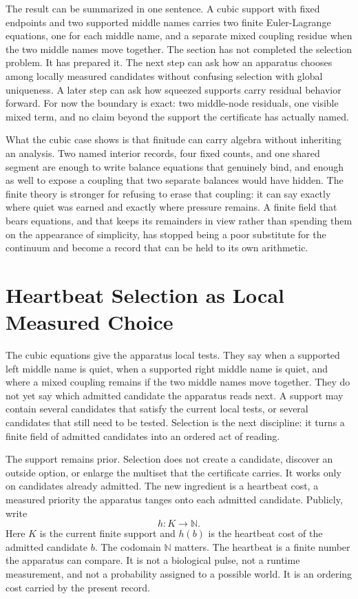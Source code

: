 The result can be summarized in one sentence. A cubic support with fixed
endpoints and two supported middle names carries two finite Euler-Lagrange
equations, one for each middle name, and a separate mixed coupling residue
when the two middle names move together. The section has not completed the
selection problem. It has prepared it. The next step can ask how an apparatus
chooses among locally measured candidates without confusing selection with
global uniqueness. A later step can ask how squeezed supports carry residual
behavior forward. For now the boundary is exact: two middle-node residuals, one visible mixed term, and no claim beyond the support the certificate has actually named.

What the cubic case shows is that finitude can carry algebra without inheriting an analysis. Two named interior records, four fixed counts, and one shared segment are enough to write balance equations that genuinely bind, and enough as well to expose a coupling that two separate balances would have hidden. The finite theory is stronger for refusing to erase that coupling: it can say exactly where quiet was earned and exactly where pressure remains. A finite field that bears equations, and that keeps its remainders in view rather than spending them on the appearance of simplicity, has stopped being a poor substitute for the continuum and become a record that can be held to its own arithmetic.

\section{Heartbeat Selection as Local Measured Choice}

The cubic equations give the apparatus local tests. They say when a supported
left middle name is quiet, when a supported right middle name is quiet, and
where a mixed coupling remains if the two middle names move together. They do
not yet say which admitted candidate the apparatus reads next. A support may
contain several candidates that satisfy the current local tests, or several
candidates that still need to be tested. Selection is the next discipline: it
turns a finite field of admitted candidates into an ordered act of reading.

The support remains prior. Selection does not create a candidate, discover an
outside option, or enlarge the multiset that the certificate carries. It works
only on candidates already admitted. The new ingredient is a heartbeat cost, a measured priority the apparatus tanges onto each admitted candidate. Publicly, write
\[
  h:K\to \mathbb{N}.
\]
Here \(K\) is the current finite support and \(h(b)\) is the heartbeat cost of
the admitted candidate \(b\). The codomain \(\mathbb{N}\) matters. The
heartbeat is a finite number the apparatus can compare. It is not a biological
pulse, not a runtime measurement, and not a probability assigned to a possible
world. It is an ordering cost carried by the present record.

